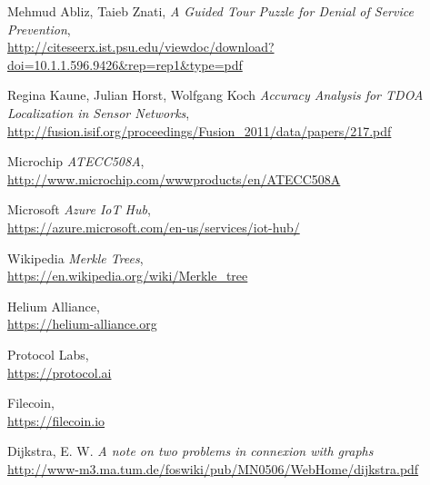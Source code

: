 \documentclass[letterpaper,11pt]{article}
\begin{document}
\begin{thebibliography}{9}
    Mehmud Abliz, Taieb Znati,
        \emph{A Guided Tour Puzzle for Denial of Service Prevention}, \\
        \url{http://citeseerx.ist.psu.edu/viewdoc/download?doi=10.1.1.596.9426&rep=rep1&type=pdf}

    Regina Kaune, Julian Horst, Wolfgang Koch
        \emph{Accuracy Analysis for TDOA Localization in Sensor Networks}, \\
        \url{http://fusion.isif.org/proceedings/Fusion_2011/data/papers/217.pdf}

    Microchip
        \emph{ATECC508A}, \\
        \url{http://www.microchip.com/wwwproducts/en/ATECC508A}

    Microsoft
        \emph{Azure IoT Hub}, \\
        \url{https://azure.microsoft.com/en-us/services/iot-hub/}

    Wikipedia
        \emph{Merkle Trees}, \\
        \url{https://en.wikipedia.org/wiki/Merkle_tree}

    Helium Alliance, \\
        \url{https://helium-alliance.org}

    Protocol Labs, \\
        \url{https://protocol.ai}

    Filecoin, \\
        \url{https://filecoin.io}

    Dijkstra, E. W.
    \emph{A note on two problems in connexion with graphs} \\
    \url{http://www-m3.ma.tum.de/foswiki/pub/MN0506/WebHome/dijkstra.pdf}

\end{thebibliography}
\end{document}
